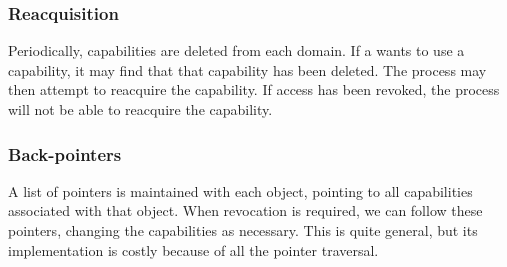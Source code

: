 \subsubsection{Reacquisition}\label{subsubsec:Capability_Revokation_Reacquisition}
Periodically, capabilities are deleted from each domain.
If a  wants to use a capability, it may find that that capability has been deleted.
The process may then attempt to reacquire the capability.
If access has been revoked, the process will not be able to reacquire the capability.

\subsubsection{Back-pointers}\label{subsubsec:Capability_Revokation_Back_Pointers}
A list of pointers is maintained with each object, pointing to all capabilities associated with that object.
When revocation is required, we can follow these pointers, changing the capabilities as necessary.
This is quite general, but its implementation is costly because of all the pointer traversal.


